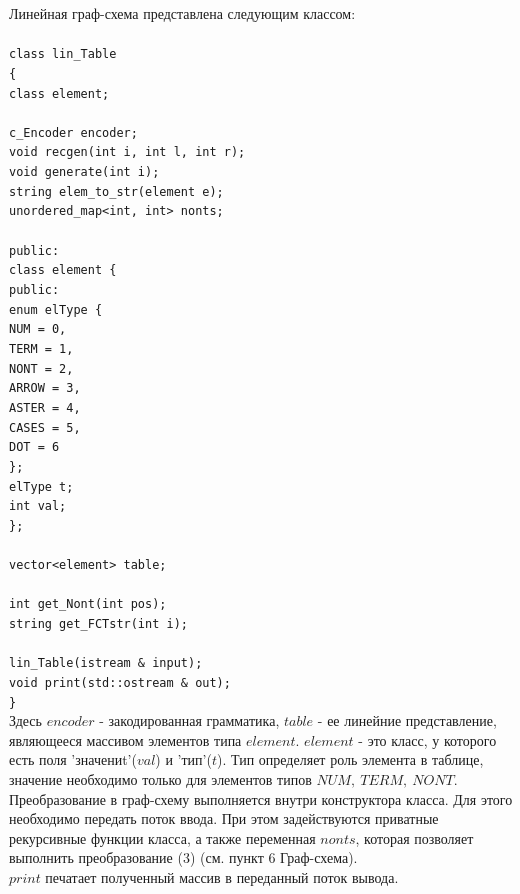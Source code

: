 \documentclass[12pt]{article}
\newcommand\tab[1][1cm]{\hspace*{#1}}
\begin{document}
Линейная граф-схема представлена следующим классом:\\
\\
\texttt{class lin\_Table\\
\{\\
\tab 	class element;\\
\\
\tab 	c\_Encoder encoder;\
\\
\tab 	void recgen(int i, int l, int r);\\
\tab 	void generate(int i);\\
\tab 	string elem\_to\_str(element e);\\
\tab 	unordered\_map<int, int> nonts;\\
\\
public:\\
\tab 	class element \{\\
\tab 	public:\\
\tab \tab 		enum elType \{\\
\tab \tab \tab 			NUM = 0,\\
\tab \tab \tab 			TERM = 1,\\
\tab \tab \tab 			NONT = 2,\\
\tab \tab \tab 			ARROW = 3,\\
\tab \tab \tab 			ASTER = 4,\\
\tab \tab \tab 			CASES = 5,\\
\tab \tab \tab 			DOT = 6\\
\tab \tab 		\};\\
\tab \tab 		elType t;\\
\tab \tab 		int val;\\
\tab \};\\
\\
\tab	vector<element> table;\\
\\
\tab 	int get\_Nont(int pos);\\
\tab 	string get\_FCTstr(int i);\\
\\	
\tab 	lin\_Table(istream \& input);\\
\tab 	void print(std::ostream \& out);\\
\}}
\\

Здесь $encoder$ - закодированная грамматика, $table$ - ее линейние представление, являющееся массивом элементов типа $element$. $element$ - это класс, у которого есть поля 'значениt'($val$) и 'тип'($t$). Тип определяет роль элемента в таблице, значение необходимо только для элементов типов $NUM,\ TERM,\ NONT$. \\
Преобразование в граф-схему выполняется внутри конструктора класса. Для этого необходимо передать поток ввода. При этом задействуются приватные рекурсивные функции класса, а также переменная $nonts$, которая позволяет выполнить преобразование (3) (см. пункт 6 Граф-схема).\\
$print$ печатает полученный массив в переданный поток вывода.
\\
\\
\end{document}
